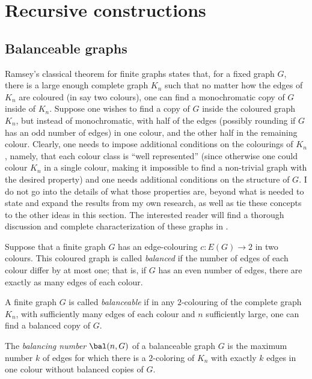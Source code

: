 
\section{Recursive constructions}\label{sec:recursive_constructions}

\subsection{Balanceable graphs}\label{subsec:amoebas_bal}

Ramsey's classical theorem for finite graphs states that, for a fixed graph $G$, there is a large enough complete graph $K_n$ such that no matter how the edges of $K_n$ are coloured (in say two colours), one can find a monochromatic copy of $G$ inside of $K_n$.
Suppose one wishes to find a copy of $G$ inside the coloured graph $K_n$, but instead of monochromatic, with half of the edges (possibly rounding if $G$ has an odd number of edges) in one colour, and the other half in the remaining colour.
Clearly, one needs to impose additional conditions on the colourings of $K_n$, namely, that each colour class is ``well represented'' (since otherwise one could colour $K_n$ in a single colour, making it impossible to find a non-trivial graph with the desired property) and one needs additional conditions on the structure of $G$.
I do not go into the details of what those properties are, beyond what is needed to state and expand the results from my own research, as well as tie these concepts to the other ideas in this section.
The interested reader will find a thorough discussion and complete characterization of these graphs in \cite[Section~2]{unavoidable_chromatic}.

\begin{definition}\label{def:balancing_num}
    Suppose that a finite graph $G$ has an edge-colouring $c\colon E(G)\to2$ in two colours.
    This coloured graph is called \emph{balanced} if the number of edges of each colour differ by at most one; that is, if $G$ has an even number of edges, there are exactly as many edges of each colour.

    A finite graph $G$ is called \emph{balanceable} if in any $2$-colouring of the complete graph $K_n$, with sufficiently many edges of each colour and $n$ sufficiently large, one can find a balanced copy of $G$.

    The \emph{balancing number} $\bal(n,G)$ of a balanceable graph $G$ is the maximum number $k$ of edges for which there is a $2$-coloring of $K_n$ with exactly $k$ edges in one colour without balanced copies of $G$.
\end{definition}

